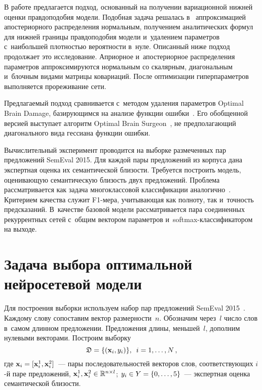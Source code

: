 \begin{multicols}{2}
В работе предлагается подход, основанный на получении вариационной нижней оценки 
правдоподобия модели. Подобная задача решалась в~\cite{Graves} аппроксимацией 
апостериорного распределения нормальным, получением аналитических формул для 
нижней границы правдоподобия модели и~удалением параметров с~наибольшей 
плотностью вероятности в~нуле. Описанный ниже подход продолжает это 
исследование. Априорное и~апостериорное распределения параметров 
аппроксимируются нормальным со скалярным, диагональным и~блочным видами матрицы 
ковариаций. После оптимизации гиперпараметров выполняется прореживание сети.

Предлагаемый подход сравнивается с~методом удаления параметров Optimal Brain 
Damage, базирующимся на анализе функции ошибки~\cite{OBD}. Его обобщенной 
версией выступает алгоритм Optimal Brain Surgeon~\cite{OBS}, не предполагающий 
диагонального вида гессиана функции ошибки.

Вычислительный эксперимент проводится на выборке размеченных пар предложений 
\mbox{SemEval} 2015. Для каждой пары предложений из корпуса дана экспертная оценка их 
семантической бли\-зости. Требуется построить модель, оценивающую семантическую 
близость двух предложений. Проблема рассматривается как задача многоклассовой 
классификации аналогично~\cite{Sanborn}. Критерием качества служит F1-ме\-ра, 
учитывающая как полноту, так и~точность предсказаний.
В~качестве базовой модели рассматривается пара соединенных рекуррентных сетей 
с~общим вектором параметров и~softmax-клас\-си\-фи\-ка\-то\-ром на выходе.

\section{Задача выбора оптимальной нейросетевой модели}

Для построения выборки используем набор пар предложений SemEval 
2015~\cite{SemEval2015}.
Каждому слову сопоставим вектор размерности~$n$.
Обозначим через~$l$ число слов в~самом длинном предложении. Предложения длины, 
меньшей~$l$, дополним нулевыми векторами.
Построим выборку
$$ 
\mathfrak{D} = \{({\mathbf{x}}_i,y_i)\},\enskip i = 1,\dots,N\,,
$$
где ${\mathbf{x}}_i = [{\mathbf{x}}_i^1,{\mathbf{x}}_i^2]$~--- пары последовательностей векторов слов, 
соответствующих $i$-й паре предложений, $\bx_i^1, \bx_i^2 \hm\in \mathbb{R}^{n\times l}$;
$y_i \hm\in Y \hm= \{0,\dots,5\}$~--- экспертная оценка семантической близости.


\end{multicols}
